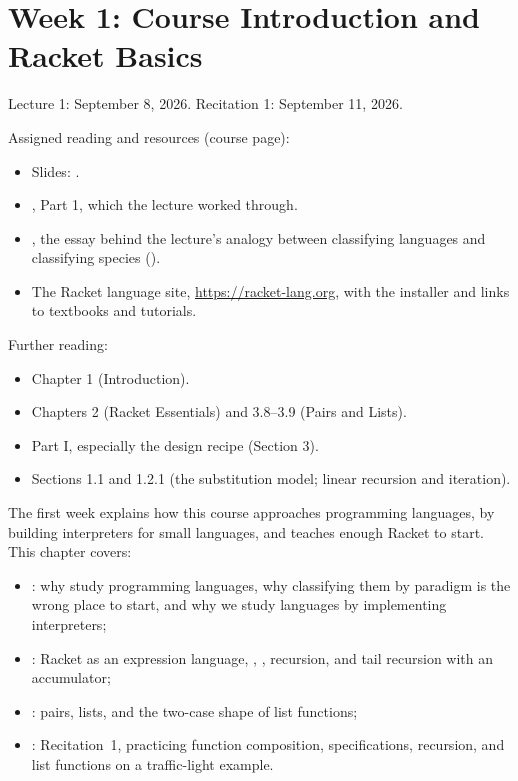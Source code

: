 \chapter{Week 1: Course Introduction and Racket Basics}
\label{ch:week1}

Lecture 1: September 8, 2026. Recitation 1: September 11, 2026.

Assigned reading and resources (course page):
\begin{itemize}
  \item Slides: .
  \item \cite{TYR}, Part 1, which the lecture worked through.
  \item \cite{Gould}, the essay behind the lecture's analogy between classifying languages and classifying species ().
  \item The Racket language site, \url{https://racket-lang.org}, with the installer and links to textbooks and tutorials.
\end{itemize}

Further reading:
\begin{itemize}
  \item \cite{PLAI} Chapter 1 (Introduction).
  \item \cite{RacketGuide} Chapters 2 (Racket Essentials) and 3.8--3.9 (Pairs and Lists).
  \item \cite{HtDP} Part I, especially the design recipe (Section 3).
  \item \cite{SICP} Sections 1.1 and 1.2.1 (the substitution model; linear recursion and iteration).
\end{itemize}

The first week explains how this course approaches programming languages, by building interpreters for small languages, and teaches enough Racket to start. This chapter covers:
\begin{itemize}
  \item {}: why study programming languages, why classifying them by paradigm is the wrong place to start, and why we study languages by implementing interpreters;
  \item {}: Racket as an expression language, , , recursion, and tail recursion with an accumulator;
  \item {}: pairs, lists, and the two-case shape of list functions;
  \item {}: Recitation~1, practicing function composition, specifications, recursion, and list functions on a traffic-light example.
\end{itemize}





